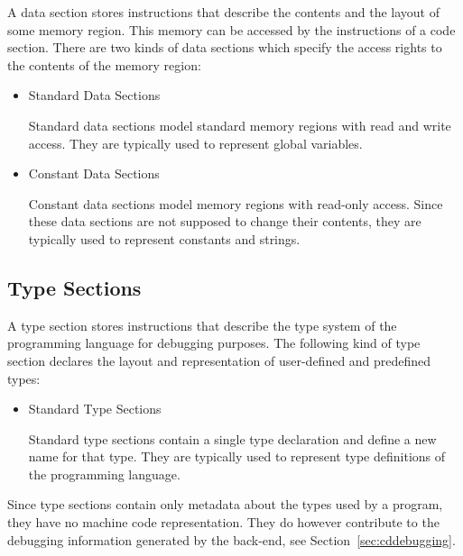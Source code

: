 A data section stores instructions that describe the contents and the layout of some memory region.
This memory can be accessed by the instructions of a code section.
There are two kinds of data sections which specify the access rights to the contents of the memory region:

\begin{itemize}

\item Standard Data Sections\alignright{}\nopagebreak

Standard data sections model standard memory regions with read and write access.
They are typically used to represent global variables.

\item Constant Data Sections\alignright{}\nopagebreak

Constant data sections model memory regions with read-only access.
Since these data sections are not supposed to change their contents, they are typically used to represent constants and strings.

\end{itemize}

\subsection{Type Sections}

A type section stores instructions that describe the type system of the programming language for debugging purposes.
The following kind of type section declares the layout and representation of user-defined and predefined types:

\begin{itemize}

\item Standard Type Sections\alignright{}\nopagebreak

Standard type sections contain a single type declaration and define a new name for that type.
They are typically used to represent type definitions of the programming language.

\end{itemize}

Since type sections contain only metadata about the types used by a program, they have no machine code representation.
They do however contribute to the debugging information generated by the back-end, see Section~\ref{sec:cddebugging}.

